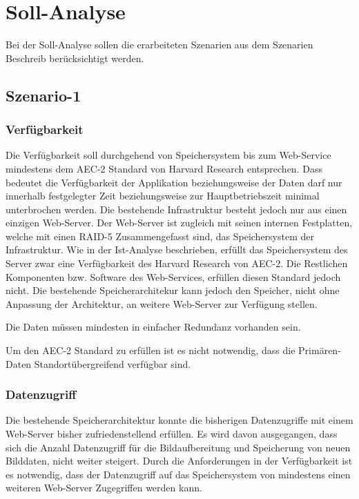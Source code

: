 \cleardoublepage
\chapter{Soll-Analyse}
Bei der Soll-Analyse sollen die erarbeiteten Szenarien aus dem Szenarien Beschreib berücksichtigt werden. 

\section{Szenario-1}\label{Soll-1}

\subsection{Verfügbarkeit}
Die Verfügbarkeit soll durchgehend von Speichersystem bis zum Web-Service mindestens dem AEC-2 Standard von Harvard Research entsprechen. Dass bedeutet die Verfügbarkeit der Applikation beziehungsweise der Daten darf nur innerhalb festgelegter Zeit beziehungsweise zur Hauptbetriebszeit minimal unterbrochen werden. Die bestehende Infrastruktur besteht jedoch nur aus einen einzigen Web-Server. Der Web-Server ist zugleich mit seinen internen Festplatten, welche mit einen RAID-5 Zusammengefasst sind, das Speichersystem der Infrastruktur. Wie in der Ist-Analyse beschrieben, erfüllt das Speichersystem des Server zwar eine Verfügbarkeit des Harvard Research von AEC-2. Die Restlichen Komponenten bzw. Software des Web-Services, erfüllen diesen Standard jedoch nicht. Die bestehende Speicherarchitekur kann jedoch den Speicher, nicht ohne Anpassung der Architektur, an weitere Web-Server zur Verfügung stellen.

Die Daten müssen mindesten in einfacher Redundanz vorhanden sein. 

Um den AEC-2 Standard zu erfüllen ist es nicht notwendig, dass die \gls{Primären-Daten} Standortübergreifend verfügbar sind.

\subsection{Datenzugriff}
Die bestehende Speicherarchitektur konnte die bisherigen Datenzugriffe mit einem Web-Server bisher zufriedenstellend erfüllen. Es wird davon ausgegangen, dass sich die Anzahl Datenzugriff für die Bildaufbereitung und Speicherung von neuen Bilddaten, nicht weiter steigert. Durch die Anforderungen in der Verfügbarkeit ist es notwendig, dass der Datenzugriff auf das Speichersystem von mindestens einen weiteren Web-Server Zugegriffen werden kann. 

